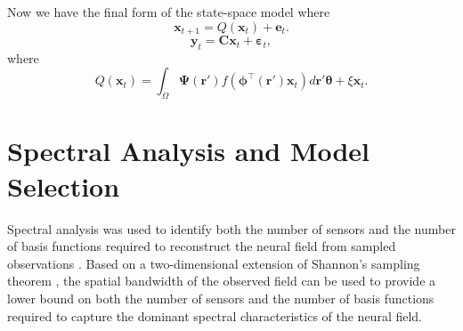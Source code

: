 \documentclass[twocolumn,11pt,a4paper]{article}		%
\begin{document}
Now we have the final form of the state-space model where
\begin{equation}\label{eq:finalformstatespacemodel}
	\mathbf{x}_{t+1} = Q(\mathbf{x}_t) +\mathbf{e}_t.
\end{equation}
\begin{equation} 
	\mathbf{y}_t = \mathbf{C}\mathbf{x}_t + \boldsymbol{\varepsilon}_t,
\end{equation}
where 
\begin{equation}\label{eq:QmatrixForSigmapoints}
	Q(\mathbf{x}_t) = \int_\Omega \boldsymbol{\Psi}(\mathbf{r}') f(\boldsymbol{\phi}^{\top}(\mathbf{r}')\mathbf{x}_t) d\mathbf{r}' \boldsymbol{\theta} + \xi\mathbf{x}_t.
\end{equation}

\section{Spectral Analysis and Model Selection}\label{SpectralAnalysisSection} Spectral analysis was used to identify both the number of sensors and the number of basis functions required to reconstruct the neural field from sampled observations \cite{Sanner1992,Scerri2009}. Based on a two-dimensional extension of Shannon's sampling theorem \cite{Peterson1962}, the spatial bandwidth of the observed field can be used to provide a lower bound on both the number of sensors and the number of basis functions required to capture the dominant spectral characteristics of the neural field.
\end{document}
